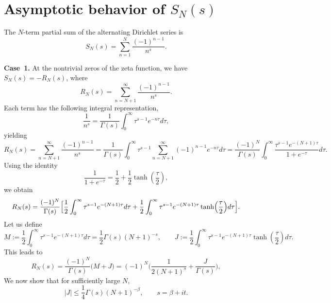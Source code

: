 \documentclass[aps,pra,twocolumn,superscriptaddress,preprintnumbers,amsmath,amssymb]{revtex4-2}
\begin{document}
\section{Asymptotic behavior of $S_{N}(s)$}
The $N$-term partial sum of the alternating Dirichlet series is 
\begin{equation}
    S_N(s)=\sum_{n=1}^{N}\frac{(-1)^{n-1}}{n^s}.
\end{equation}\par
\textbf{Case~1.}  At the nontrivial zeros of the  zeta function, we have $S_N(s) = -R_N(s)$, where
\begin{equation}
    R_N(s)=\sum_{n=N+1}^{\infty}\frac{(-1)^{n-1}}{n^s}.
\end{equation}
Each term has the following integral representation,
\begin{equation}
   \frac{1}{n^s} = \frac{1}{\Gamma(s)} \int_0^{\infty} \tau^{s-1} e^{-n\tau} d\tau,
\end{equation}
yielding
\begin{equation}
    R_N(s) = \sum_{n=N+1}^{\infty} \frac{(-1)^{n-1}}{n^s} = \frac{1}{\Gamma(s)} \int_0^{\infty} \tau^{s-1} \sum_{n=N+1}^{\infty} (-1)^{n-1} e^{-n\tau} d\tau=\frac{(-1)^N}{\Gamma(s)} \int_0^{\infty} \frac{\tau^{s-1} e^{-(N+1)\tau}}{1+e^{-\tau}} d\tau.
\end{equation} 
Using the identity
\begin{equation}
    \frac{1}{1+e^{-\tau}} = \frac{1}{2} + \frac{1}{2} \tanh\left(\frac{\tau}{2}\right),
\end{equation}
we obtain
\begin{equation}\label{eq:MJ}
    R_N(s) = \frac{(-1)^N}{\Gamma(s)} \Bigl[\frac{1}{2}\int_0^{\infty}\tau^{s-1} e^{-(N+1)\tau}d\tau+\frac{1}{2}\int_0^{\infty}\tau^{s-1} e^{-(N+1)\tau}\tanh( \frac{\tau}{2})d\tau\Bigr].
\end{equation}
Let us define
\begin{equation}
    M:=\frac{1}{2}\int_0^\infty \tau^{s-1}e^{-(N+1)\tau}d\tau=\frac{1}{2}\Gamma(s)(N+1)^{-s}, \qquad J:=\frac{1}{2}\int_0^\infty \tau^{s-1}e^{-(N+1)\tau}\tanh( \frac{\tau}{2})d\tau.
\end{equation}
This leads to
\begin{equation}\label{eq:sum}
R_N(s)=\frac{(-1)^N}{\Gamma(s)}\big(M+J\big)=(-1)^N\Big(\frac{1}{2(N+1)^s}+\frac{J}{\Gamma(s)}\Big),
\end{equation}
We now show that for sufficiently large $N$, 
\begin{equation}
    |J|\leq\frac{1}{4}\Gamma(s)(N+1)^{-\beta}, \qquad s=\beta+it.
\end{equation}\par
\end{document}
